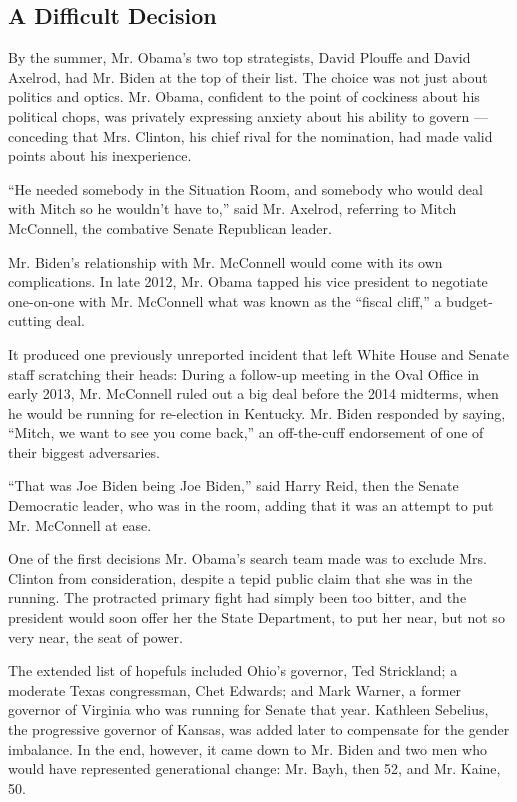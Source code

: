\hypertarget{a-difficult-decision}{%
\subsection{A Difficult Decision}\label{a-difficult-decision}}

By the summer, Mr. Obama's two top strategists, David Plouffe and David
Axelrod, had Mr. Biden at the top of their list. The choice was not just
about politics and optics. Mr. Obama, confident to the point of
cockiness about his political chops, was privately expressing anxiety
about his ability to govern --- conceding that Mrs. Clinton, his chief
rival for the nomination, had made valid points about his inexperience.

``He needed somebody in the Situation Room, and somebody who would deal
with Mitch so he wouldn't have to,'' said Mr. Axelrod, referring to
Mitch McConnell, the combative Senate Republican leader.

Mr. Biden's relationship with Mr. McConnell would come with its own
complications. In late 2012, Mr. Obama tapped his vice president to
negotiate one-on-one with Mr. McConnell what was known as the ``fiscal
cliff,'' a budget-cutting deal.

It produced one previously unreported incident that left White House and
Senate staff scratching their heads: During a follow-up meeting in the
Oval Office in early 2013, Mr. McConnell ruled out a big deal before the
2014 midterms, when he would be running for re-election in Kentucky. Mr.
Biden responded by saying, ``Mitch, we want to see you come back,'' an
off-the-cuff endorsement of one of their biggest adversaries.

``That was Joe Biden being Joe Biden,'' said Harry Reid, then the Senate
Democratic leader, who was in the room, adding that it was an attempt to
put Mr. McConnell at ease.

One of the first decisions Mr. Obama's search team made was to exclude
Mrs. Clinton from consideration, despite a tepid public claim that she
was in the running. The protracted primary fight had simply been too
bitter, and the president would soon offer her the State Department, to
put her near, but not so very near, the seat of power.

The extended list of hopefuls included Ohio's governor, Ted Strickland;
a moderate Texas congressman, Chet Edwards; and Mark Warner, a former
governor of Virginia who was running for Senate that year. Kathleen
Sebelius, the progressive governor of Kansas, was added later to
compensate for the gender imbalance. In the end, however, it came down
to Mr. Biden and two men who would have represented generational change:
Mr. Bayh, then 52, and Mr. Kaine, 50.


